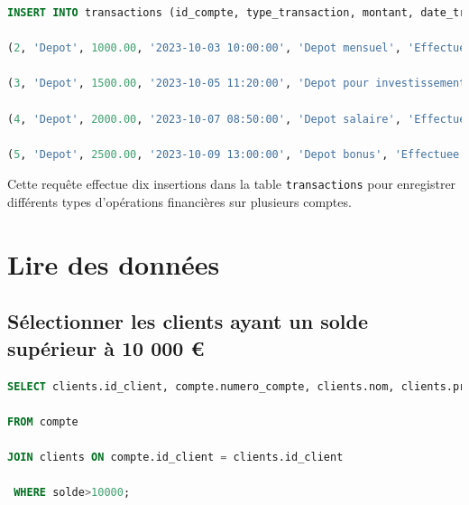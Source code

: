 \documentclass[12pt,a4paper]{article}
\begin{document}
\begin{lstlisting}[language=SQL]
INSERT INTO transactions (id_compte, type_transaction, montant, date_transaction, description, statut) VALUES (1, 'Depot', 500.00, '2023-10-01 09:15:00', 'Depot initial', 'Effectuee'), (1, 'Retrait', 200.00, '2023-10-02 14:30:00', 'Retrait au distributeur', 'Effectuee'), 

(2, 'Depot', 1000.00, '2023-10-03 10:00:00', 'Depot mensuel', 'Effectuee'), (2, 'Virement', 300.00, '2023-10-04 16:45:00', 'Virement a un ami', 'Effectuee'), 

(3, 'Depot', 1500.00, '2023-10-05 11:20:00', 'Depot pour investissement', 'Effectuee'), (3, 'Retrait', 700.00, '2023-10-06 12:10:00', 'Retrait pour achats', 'Effectuee'), 

(4, 'Depot', 2000.00, '2023-10-07 08:50:00', 'Depot salaire', 'Effectuee'), (4, 'Virement', 400.00, '2023-10-08 17:30:00', 'Virement pour facture', 'Effectuee'), 

(5, 'Depot', 2500.00, '2023-10-09 13:00:00', 'Depot bonus', 'Effectuee'), (5, 'Retrait', 1000.00, '2023-10-10 18:00:00', 'Retrait pour vacances', 'Effectuee'); 
\end{lstlisting}

\vspace{.5cm}

Cette requête effectue dix insertions dans la table \texttt{transactions} pour enregistrer différents types d'opérations financières sur plusieurs comptes.

\newpage

\section{Lire des données}

	\subsection{Sélectionner les clients ayant un solde supérieur à 10 000 €}
	
\begin{lstlisting}[language=SQL]
SELECT clients.id_client, compte.numero_compte, clients.nom, clients.prenom, compte.solde 

FROM compte  

JOIN clients ON compte.id_client = clients.id_client 

 WHERE solde>10000; 
\end{lstlisting}	

\vspace{.5cm}
\end{document}
